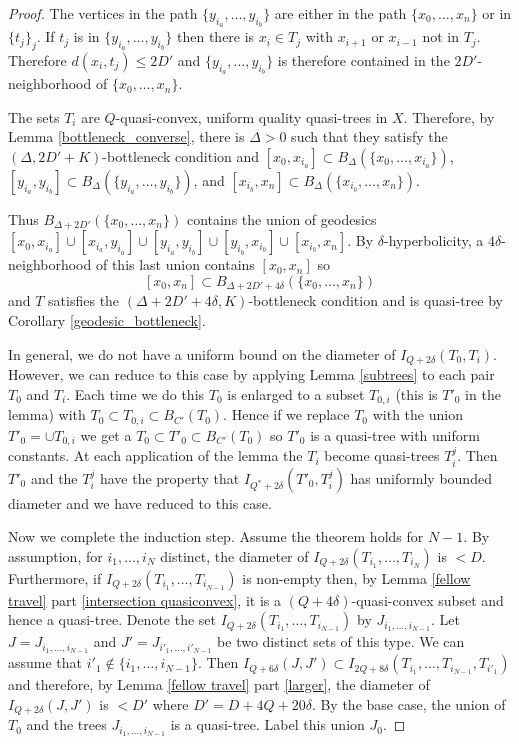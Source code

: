 \documentclass[10pt,a4paper]{amsart}
\begin{document}
\begin{proof}
The vertices in the path $\{y_{i_a},\ldots,y_{i_b}\}$ are either in the path $\{x_0,\ldots,x_n\}$ or in $\{t_j\}_j$. If $t_j$ is in $\{y_{i_a},\ldots,y_{i_b}\}$ then there is $x_i \in T_j$ with $x_{i+1}$ or $x_{i-1}$ not in $T_j$. Therefore $d(x_i, t_j) \le 2D'$ and $\{y_{i_a},\ldots,y_{i_b}\}$ is therefore contained in the $2D'$-neighborhood of $\{x_0,\ldots,x_n\}$.

The sets $T_i$ are $Q$-quasi-convex, uniform quality quasi-trees in $X$. Therefore, by Lemma \ref{bottleneck_converse}, there is $\Delta>0$ such that they satisfy the $(\Delta,2D'+K)$-bottleneck condition and
$[x_0, x_{i_a}] \subset B_\Delta(\{x_0, \dots, x_{i_a}\})$,
$ [y_{i_a}, y_{i_b}] \subset  B_\Delta(\{y_{i_a}, \dots, y_{i_b}\})$, and 
$ [x_{i_b}, x_n] \subset  B_\Delta(\{x_{i_b}, \dots, x_n\})$.

 Thus $B_{\Delta +2D'}(\{x_0, \dots, x_n\})$ contains the union of geodesics $[x_0, x_{i_a}] \cup [x_{i_a}, y_{i_a}] \cup [y_{i_a}, y_{i_b}] \cup [y_{i_b}, x_{i_b}] \cup [x_{i_b}, x_n]$. By $\delta$-hyperbolicity, a $4\delta$-neighborhood of this last union contains $[x_0, x_n]$ so
 $$[x_0, x_n] \subset B_{\Delta + 2D' + 4\delta}(\{x_0, \dots, x_n\})$$ and $T$ satisfies the $(\Delta + 2D'+4\delta, K)$-bottleneck condition and is quasi-tree by Corollary \ref{geodesic_bottleneck}.
 
In general, we do not have a uniform bound on the diameter of $I_{Q+2\delta}(T_0, T_i)$. However, we can reduce to this case by applying Lemma \ref{subtrees} to each pair $T_0$ and $T_i$. Each time we do this $T_0$ is enlarged to a subset $T_{0,i}$ (this is $T'_0$ in the lemma) with $T_0 \subset T_{0,i} \subset B_{C'}(T_0)$. Hence if we replace $T_0$ with the union $T'_0 =  \cup T_{0,i}$ we get a $T_0 \subset T'_{0} \subset B_{C'}(T_0)$ so $T'_0$ is a quasi-tree with uniform constants. At each application of the lemma the $T_i$ become quasi-trees $T^j_i$. Then $T'_0$ and the $T^j_i$ have the property that $I_{Q^*+2\delta}(T'_0, T^j_i)$ has uniformly bounded diameter and we have reduced to this case.

Now we complete the induction step. Assume the theorem holds for $N-1$. By assumption, for $i_1, \ldots, i_N$ distinct, the diameter of $I_{Q+2\delta}(T_{i_1}, \dots, T_{i_N})$ is $<D$.
Furthermore, if $I_{Q+2\delta}(T_{i_1}, \dots, T_{i_{N-1}})$ is non-empty then, by Lemma \ref{fellow travel} part \eqref{intersection quasiconvex}, it is a $(Q+4\delta)$-quasi-convex subset and hence a quasi-tree. Denote the set $I_{Q+2\delta}(T_{i_1},\ldots,T_{i_{N-1}})$ by $J_{{i_1}, \dots, {i_{N-1}}}$. Let $J = J_{{i_1}, \dots, {i_{N-1}}}$ and $J'=J_{{i'_1}, \dots, {i'_{N-1}}}$ be two distinct sets of this type. We can assume that $i'_1 \not\in \{i_1, \dots, i_{N-1}\}$. Then $I_{Q+6\delta}(J, J') \subset I_{2Q+ 8\delta}(T_{i_1}, \dots, T_{i_{N-1}}, T_{i'_1})$ and therefore, by Lemma \ref{fellow travel} part \eqref{larger}, the diameter of $I_{Q+2\delta}(J, J')$ is $< D'$ where $D' = D+4Q+20\delta$. By the base case, the union of $T_0$ and the trees $J_{{i_1}, \dots, {i_{N-1}}}$ is a quasi-tree. Label this union $J_0$.


\end{proof}
\end{document}
